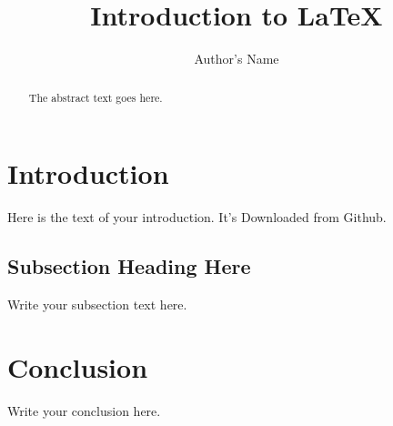 \documentclass{article}
\begin{document}
\title{Introduction to \LaTeX{}}
\author{Author's Name}

\maketitle

\begin{abstract}
The abstract text goes here.
\end{abstract}

\section{Introduction}
Here is the text of your introduction.
It's Downloaded from Github.

\subsection{Subsection Heading Here}
Write your subsection text here.

\section{Conclusion}
Write your conclusion here.
\end{document}
